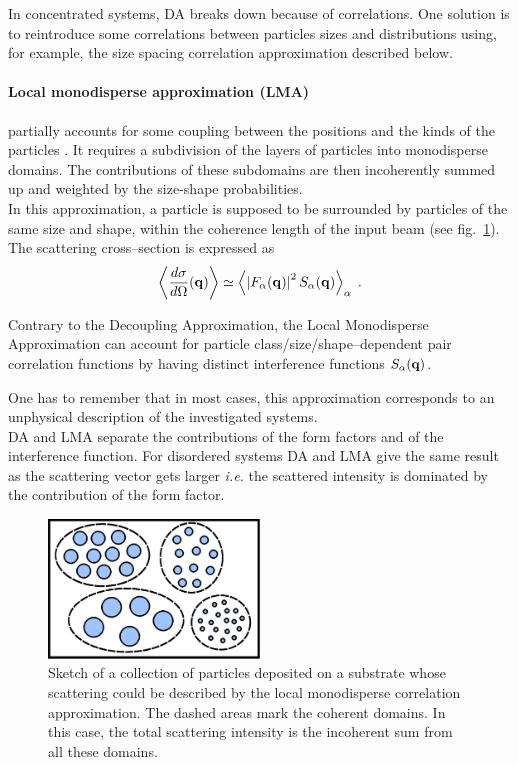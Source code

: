 In concentrated systems, DA breaks down because of correlations. One solution is to reintroduce some correlations between particles sizes and distributions using, for example, the size spacing correlation approximation described below. 

\paragraph{Local monodisperse approximation (LMA)} partially accounts for some coupling between the positions and the kinds of the particles \cite{Ped94}. 
 It requires a subdivision of the layers of particles into monodisperse domains. The contributions of these subdomains are then  incoherently summed up and weighted by the size-shape probabilities.\\ In this approximation, a particle is supposed to be surrounded by particles of the same size and shape, within the coherence length of the input beam (see fig.~\ref{fig:lma}). The scattering cross--section is expressed as
\begin{equation*}
  \left\langle \frac{d\sigma}{d\Omega}(\mathbf{q}) \right\rangle \simeq \left\langle \left\lvert F_\alpha(\mathbf{q})\right\rvert ^2 S_\alpha(\mathbf{q}) \right\rangle_\alpha \; .
\end{equation*}

Contrary to the Decoupling Approximation, the Local Monodisperse Approximation can account for particle class/size/shape--dependent pair correlation functions by having distinct interference functions $S_\alpha(\mathbf{q})$.

One has to remember that in most cases, this approximation corresponds to an unphysical description of the investigated systems. \\ 

DA and LMA separate the contributions of the form factors and of the interference function. For disordered systems DA and LMA give the same result as the scattering vector gets larger \textit{i.e.} the scattered intensity is dominated by the contribution of the form factor.

\begin{figure}[ht]
\begin{center}
\includegraphics[width=0.5\textwidth]{Figures/drawing/drawingLMA.eps}
\end{center}
\caption{Sketch of a collection of particles deposited on a substrate whose scattering could be described by the local monodisperse correlation approximation. The dashed areas mark the coherent domains. In this case, the total scattering intensity is the incoherent sum from all these domains.}
\label{fig:lma}
\end{figure}

